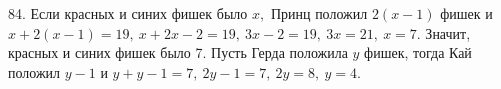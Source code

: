 84. Если красных и синих фишек было $x,$ Принц положил $2(x-1)$ фишек и $x+2(x-1)=19,\ x+2x-2=19,\ 3x-2=19,\ 3x=21,\ x=7.$ Значит, красных и синих фишек было 7. Пусть Герда положила $y$ фишек, тогда Кай положил $y-1$ и $y+y-1=7,\ 2y-1=7,\ 2y=8,\ y=4.$\\

